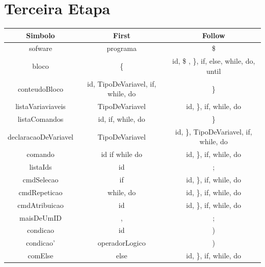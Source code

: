 \documentclass[11pt]{article}
\begin{document}
\section*{Terceira Etapa}

\begin{table}[H]
    \hspace{-3cm}
    \begin{tabular}{c|c|c}
        \hline
        \textbf{Simbolo}     & \textbf{First}                      & \textbf{Follow}  \\
        \hline
        sofware              & programa                            & \$                \\
        \hline
         bloco               & \{                                  & id, \$ , \}, if, else, while, do, until\\
        \hline
        conteudoBloco        & id, TipoDeVariavel, if, while, do   & \}        \\
        \hline
        listaVariaviaveis    & TipoDeVariavel                      & id, \}, if, while, do \\
        \hline
        listaComandos        & id, if, while, do                   & \} \\
        \hline
        declaracaoDeVariavel & TipoDeVariavel                      & id, \}, TipoDeVariavel, if, while, do \\
        \hline
        comando              & id if while do                      & id, \}, if, while, do \\
        \hline
        listaIds             & id                                  & ; \\
        \hline
        cmdSelecao           & if                                  & id, \}, if, while, do\\
        \hline
        cmdRepeticao         & while, do                           & id, \}, if, while, do \\
        \hline
        cmdAtribuicao        & id                                  & id, \}, if, while, do \\
        \hline
        maisDeUmID           & ,                                   & ; \\
        \hline
        condicao             & id                                  & ) \\
        \hline
        condicao'            & operadorLogico                      & ) \\
        \hline
        comElse              & else                                & id, \}, if, while, do \\

\end{tabular}
\end{table}
\end{document}
